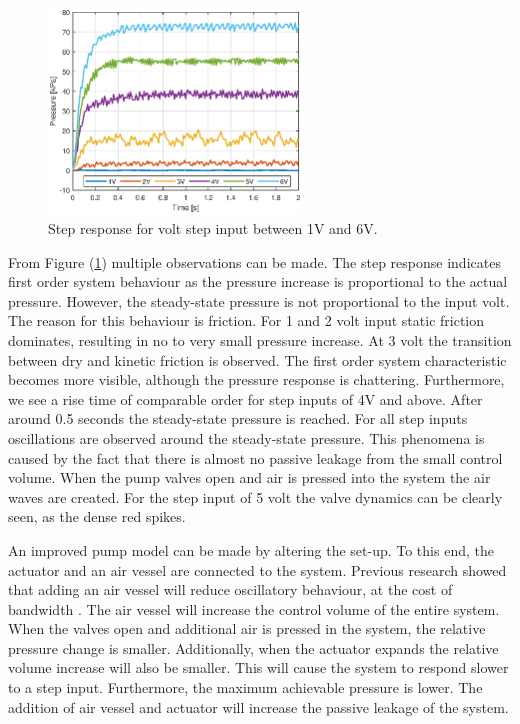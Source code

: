 \begin{figure}[H]
    \centering
    \includegraphics[width = 0.6\textwidth]{Figures/Chapter3/stepresponsdirect16V.eps}
    \caption{Step response for volt step input between 1V and 6V.}
    \label{fig1:pump_dynamcis}
\end{figure}

From Figure (\ref{fig1:pump_dynamcis}) multiple observations can be made. The step response indicates first order system behaviour as the pressure increase is proportional to the actual pressure. However, the steady-state pressure is not proportional to the input volt. The reason for this behaviour is friction. For 1 and 2 volt input static friction dominates, resulting in no to very small pressure increase.
At 3 volt the transition between dry and kinetic friction is observed. The first order system characteristic becomes more visible, although the pressure response is chattering. Furthermore, we see a rise time of comparable order for step inputs of 4V and above. After around 0.5 seconds the steady-state pressure is reached. For all step inputs oscillations are observed around the steady-state pressure. This phenomena is caused by the fact that there is almost no passive leakage from the small control volume. When the pump valves open and air is pressed into the system the air waves are created. For the step input of 5 volt the valve dynamics can be clearly seen, as the dense red spikes.

An improved pump model can be made by altering the set-up. To this end, the actuator and an air vessel are connected to the system. Previous research showed that adding an air vessel will reduce oscillatory behaviour, at the cost of bandwidth \cite{proper}. The air vessel will increase the control volume of the entire system. When the valves open and additional air is pressed in the system, the relative pressure change is smaller. Additionally, when the actuator expands the relative volume increase will also be smaller. This will cause the system to respond slower to a step input. Furthermore, the maximum achievable pressure is lower. The addition of air vessel and actuator will increase the passive leakage of the system.

